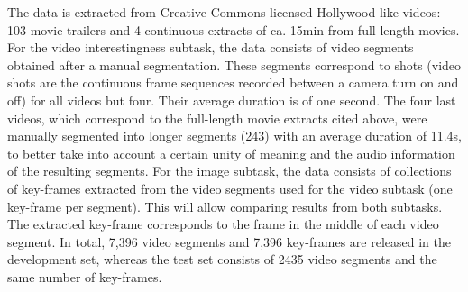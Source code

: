 \documentclass[sigconf]{acmart-me}
\begin{document}
The data is extracted from Creative Commons licensed Hollywood-like videos: 103 movie trailers and 4 continuous extracts of ca. 15min from full-length movies. 
For the video interestingness subtask, the data consists of video segments obtained after a manual segmentation. These segments correspond to shots (video shots are the continuous frame sequences recorded between a camera turn on and off) for all videos but four. Their average duration is of one second. The four last videos, which correspond to the full-length movie extracts cited above, were manually segmented into longer segments (243) with an average duration of 11.4s, to better take into account a certain unity of meaning and the audio information of the resulting segments. For the image subtask, the data consists of collections of key-frames extracted from the video segments used for the video subtask (one key-frame per segment). This will allow comparing results from both subtasks. The extracted key-frame corresponds to the frame in the middle of each video segment.
In total, 7,396 video segments and 7,396 key-frames are released in the development set, whereas the test set consists of 2435 video segments and the same number of key-frames.

\end{document}
